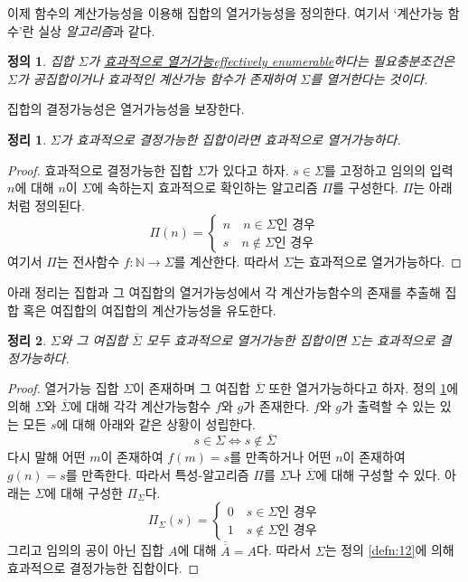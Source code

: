 \documentclass[a4paper,chapter,atbegshi]{oblivoir}
\newtheorem{defn}{정의}[chapter]
\newtheorem{theo}{정리}[chapter]
\begin{document}
이제 함수의 계산가능성을 이용해 집합의 열거가능성을 정의한다. 여기서
`계산가능 함수'란 실상 \emph{알고리즘}과 같다.
\begin{defn}\label{defn:13}
  집합 $\Sigma$가 \underline{효과적으로 열거가능\tiny effectively 
  enumerable}하다는 필요충분조건은 $\Sigma$가 공집합이거나 
  효과적인 계산가능 함수가 존재하여 $\Sigma$를 열거한다는 것이다.
\end{defn}
집합의 결정가능성은 열거가능성을 보장한다.
\begin{theo}\label{theo:15}
  $\Sigma$가 효과적으로 결정가능한 집합이라면 효과적으로 열거가능하다.
\end{theo}
\begin{proof}
  효과적으로 결정가능한 집합 $\Sigma$가 있다고 하자. $s\in\Sigma$를
  고정하고 임의의 입력 $n$에 대해 $n$이 $\Sigma$에 속하는지
  효과적으로 확인하는 알고리즘 $\Pi$를 구성한다. $\Pi$는
  아래처럼 정의된다.
  \[
    \Pi(n) = \begin{cases}n\quad n\in\Sigma\textrm{인 경우}\\
    s\quad n\notin\Sigma\textrm{인 경우}\end{cases}
  \]
  여기서 $\Pi$는 전사함수 $f:\mathbb{N}\rightarrow\Sigma$를 계산한다. 
  따라서 $\Sigma$는 효과적으로 열거가능하다.
\end{proof}
아래 정리는 집합과 그 여집합의 열거가능성에서 각 계산가능함수의 존재를
추출해 집합 혹은 여집합의 여집합의 계산가능성을 유도한다.
\begin{theo}
  $\Sigma$와 그 여집합 $\overline{\Sigma}$ 모두 효과적으로 열거가능한
  집합이면 $\Sigma$는 효과적으로 결정가능하다.
\end{theo}
\begin{proof}
  열거가능 집합 $\Sigma$이 존재하며 그 여집합 $\overline{\Sigma}$ 또한
  열거가능하다고 하자. 정의 \ref{defn:13}에 의해 $\Sigma$와 $\overline{\Sigma}$에
  대해 각각 계산가능함수 $f$와 $g$가 존재한다. $f$와 $g$가 출력할 수 있는
  있는 모든 $s$에 대해 아래와 같은 상황이 성립한다. 
  \[
    s\in\Sigma \iff s\notin\overline{\Sigma} 
  \]
  다시 말해 어떤 $m$이 존재하여 $f(m)=s$를 만족하거나 어떤 $n$이 존재하여
  $g(n)=s$를 만족한다. 따라서 특성-알고리즘 $\Pi$를 $\Sigma$나
  $\overline{\Sigma}$에 대해 구성할 수 있다. 아래는 $\Sigma$에 대해 구성한
  $\Pi_{\Sigma}$다.
  \[
    \Pi_{\Sigma}(s)=
    \begin{cases}
      0\quad s\in\Sigma\textrm{인 경우} \\
      1\quad s\notin\Sigma\textrm{인 경우}
    \end{cases}
  \]
  그리고 임의의 공이 아닌 집합 $A$에 대해 $\overline{\overline{A}}=A$다.
  따라서 $\Sigma$는 정의 \ref{defn:12}에 의해 효과적으로 결정가능한 집합이다.
\end{proof}
\end{document}
